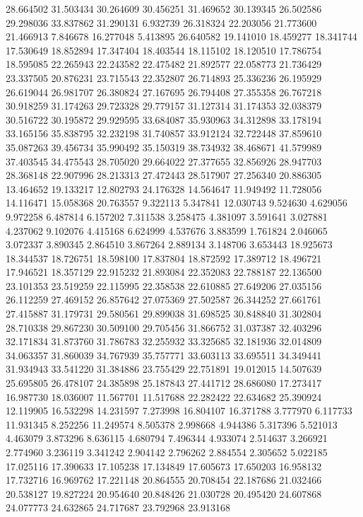 28.664502
31.503434
30.264609
30.456251
31.469652
30.139345
26.502586
29.298036
33.837862
31.290131
6.932739
26.318324
22.203056
21.773600
21.466913
7.846678
16.277048
5.413895
26.640582
19.141010
18.459277
18.341744
17.530649
18.852894
17.347404
18.403544
18.115102
18.120510
17.786754
18.595085
22.265943
22.243582
22.475482
21.892577
22.058773
21.736429
23.337505
20.876231
23.715543
22.352807
26.714893
25.336236
26.195929
26.619044
26.981707
26.380824
27.167695
26.794408
27.355358
26.767218
30.918259
31.174263
29.723328
29.779157
31.127314
31.174353
32.038379
30.516722
30.195872
29.929595
33.684087
35.930963
34.312898
33.178194
33.165156
35.838795
32.232198
31.740857
33.912124
32.722448
37.859610
35.087263
39.456734
35.990492
35.150319
38.734932
38.468671
41.579989
37.403545
34.475543
28.705020
29.664022
27.377655
32.856926
28.947703
28.368148
22.907996
28.213313
27.472443
28.517907
27.256340
20.886305
13.464652
19.133217
12.802793
24.176328
14.564647
11.949492
11.728056
14.116471
15.058368
20.763557
9.322113
5.347841
12.030743
9.524630
4.629056
9.972258
6.487814
6.157202
7.311538
3.258475
4.381097
3.591641
3.027881
4.237062
9.102076
4.415168
6.624999
4.537676
3.883599
1.761824
2.046065
3.072337
3.890345
2.864510
3.867264
2.889134
3.148706
3.653443
18.925673
18.344537
18.726751
18.598100
17.837804
18.872592
17.389712
18.496721
17.946521
18.357129
22.915232
21.893084
22.352083
22.788187
22.136500
23.101353
23.519259
22.115995
22.358538
22.610885
27.649206
27.035156
26.112259
27.469152
26.857642
27.075369
27.502587
26.344252
27.661761
27.415887
31.179731
29.580561
29.899038
31.698525
30.848840
31.302804
28.710338
29.867230
30.509100
29.705456
31.866752
31.037387
32.403296
32.171834
31.873760
31.786783
32.255932
33.325685
32.181936
32.014809
34.063357
31.860039
34.767939
35.757771
33.603113
33.695511
34.349441
31.934943
33.541220
31.384886
23.755429
22.751891
19.012015
14.507639
25.695805
26.478107
24.385898
25.187843
27.441712
28.686080
17.273417
16.987730
18.036007
11.567701
11.517688
22.282422
22.634682
25.390924
12.119905
16.532298
14.231597
7.273998
16.804107
16.371788
3.777970
6.117733
11.931345
8.252256
11.249574
8.505378
2.998668
4.944386
5.317396
5.521013
4.463079
3.873296
8.636115
4.680794
7.496344
4.933074
2.514637
3.266921
2.774960
3.236119
3.341242
2.904142
2.796262
2.884554
2.305652
5.022185
17.025116
17.390633
17.105238
17.134849
17.605673
17.650203
16.958132
17.732716
16.969762
17.221148
20.864555
20.708454
22.187686
21.032466
20.538127
19.827224
20.954640
20.848426
21.030728
20.495420
24.607868
24.077773
24.632865
24.717687
23.792968
23.913168
